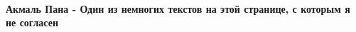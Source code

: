  
 
 
 
 
\paragraph{Акмаль Пана - Один из немногих текстов на этой странице, с которым я не согласен}
\label{sec:14_07_2021.fb.krjukova_svetlana.1.statja_putina_mnenie.cmt.pana_nesoglasie_teksty}

